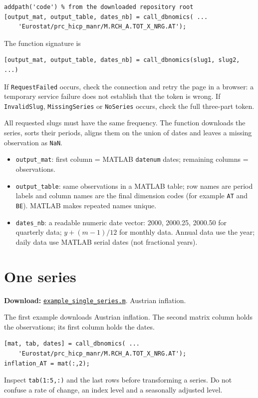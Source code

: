 \documentclass[a4paper,12pt]{article}
\begin{document}
\begin{verbatim}
addpath('code') % from the downloaded repository root
[output_mat, output_table, dates_nb] = call_dbnomics( ...
    'Eurostat/prc_hicp_manr/M.RCH_A.TOT_X_NRG.AT');
\end{verbatim}

The function signature is
\begin{verbatim}
[output_mat, output_table, dates_nb] = call_dbnomics(slug1, slug2, ...)
\end{verbatim}
If \texttt{RequestFailed} occurs, check the connection and retry the page in a browser: a temporary service failure does not establish that the token is wrong. If \texttt{InvalidSlug}, \texttt{MissingSeries} or \texttt{NoSeries} occurs, check the full three-part token.\par
All requested slugs must have the same frequency. The function downloads the
series, sorts their periods, aligns them on the union of dates and leaves a
missing observation as \texttt{NaN}.

\begin{itemize}
\item \texttt{output\_mat}: first column = MATLAB \texttt{datenum} dates;
remaining columns = observations.
\item \texttt{output\_table}: same observations in a MATLAB table; row names
are period labels and column names are the final dimension codes (for example
\texttt{AT} and \texttt{BE}). MATLAB makes repeated names unique.
\item \texttt{dates\_nb}: a readable numeric date vector: 2000, 2000.25,
2000.50 for quarterly data; $y+(m-1)/12$ for monthly data. Annual data use the year; daily data use MATLAB serial dates (not fractional years).
\end{itemize}

\section{One series}

\noindent\textbf{Download:} \href{https://raw.githubusercontent.com/Vermandel/dbnomics-teaching/1ff66c0c5d96b06556e5c0a202877cdc4a117d74/examples/example_single_series.m}{\texttt{example\_single\_series.m}}. Austrian inflation.

The first example downloads Austrian inflation. The second matrix column holds
the observations; its first column holds the dates.
\begin{verbatim}
[mat, tab, dates] = call_dbnomics( ...
    'Eurostat/prc_hicp_manr/M.RCH_A.TOT_X_NRG.AT');
inflation_AT = mat(:,2);
\end{verbatim}
Inspect \texttt{tab(1:5,:)} and the last rows before transforming a series.
Do not confuse a rate of change, an index level and a seasonally adjusted level.
\end{document}
